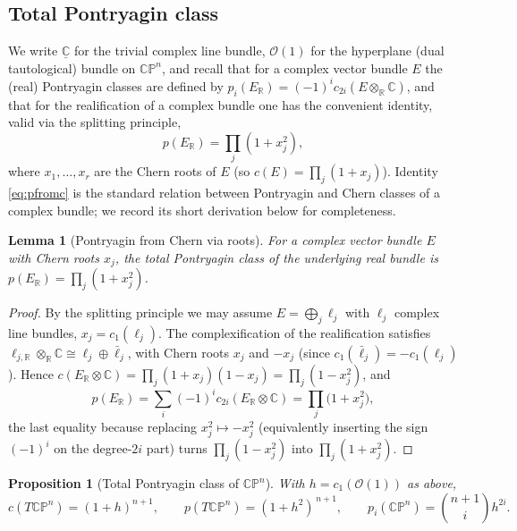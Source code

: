 \documentclass[12pt]{article}
\newtheorem{lemma}{Lemma}
\newtheorem{proposition}{Proposition}
\theoremstyle{definition}
\begin{document}
\subsection*{Total Pontryagin class}

We write $\underline{\mathbb{C}}$ for the trivial complex line bundle, $\mathcal{O}(1)$
for the hyperplane (dual tautological) bundle on $\mathbb{CP}^n$, and recall that for a
complex vector bundle $E$ the (real) Pontryagin classes are defined by
$p_i(E_{\mathbb{R}})=(-1)^i c_{2i}(E\otimes_{\mathbb{R}}\mathbb{C})$, and that for the
realification of a complex bundle one has the convenient identity, valid via the
splitting principle,
\[
p(E_{\mathbb{R}})=\prod_j (1+x_j^2),
\tag{$\dagger$}\label{eq:pfromc}
\]
where $x_1,\dots,x_r$ are the Chern roots of $E$ (so $c(E)=\prod_j(1+x_j)$).  Identity
\eqref{eq:pfromc} is the standard relation between Pontryagin and Chern classes of a
complex bundle; we record its short derivation below for completeness.

\begin{lemma}[Pontryagin from Chern via roots]\label{lem:pfromc}
For a complex vector bundle $E$ with Chern roots $x_j$, the total Pontryagin class of the
underlying real bundle is $p(E_{\mathbb{R}})=\prod_j(1+x_j^2)$.
\end{lemma}

\begin{proof}
By the splitting principle we may assume $E=\bigoplus_j \ell_j$ with $\ell_j$ complex line
bundles, $x_j=c_1(\ell_j)$.  The complexification of the realification satisfies
$\ell_{j,\mathbb{R}}\otimes_{\mathbb{R}}\mathbb{C}\cong \ell_j\oplus\bar\ell_j$, with Chern
roots $x_j$ and $-x_j$ (since $c_1(\bar\ell_j)=-c_1(\ell_j)$).  Hence
$c(E_{\mathbb{R}}\otimes\mathbb{C})=\prod_j(1+x_j)(1-x_j)=\prod_j(1-x_j^2)$, and
\[
p(E_{\mathbb{R}})=\sum_i (-1)^i c_{2i}(E_{\mathbb{R}}\otimes\mathbb{C})
=\prod_j\big(1+x_j^2\big),
\]
the last equality because replacing $x_j^2\mapsto -x_j^2$ (equivalently inserting the sign
$(-1)^i$ on the degree-$2i$ part) turns $\prod_j(1-x_j^2)$ into $\prod_j(1+x_j^2)$.
\end{proof}

\begin{proposition}[Total Pontryagin class of $\mathbb{CP}^n$]\label{prop:cppont}
With $h=c_1(\mathcal{O}(1))$ as above,
\[
c(T\mathbb{CP}^n)=(1+h)^{n+1},
\qquad
p(T\mathbb{CP}^n)=(1+h^2)^{\,n+1},
\qquad
p_i(\mathbb{CP}^n)=\binom{n+1}{i}h^{2i}.
\]
\end{proposition}
\end{document}
